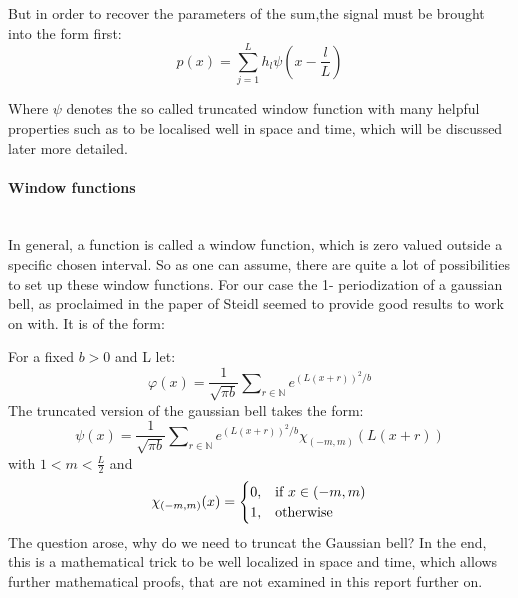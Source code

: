 \documentclass{article}
\begin{document}
But in order to recover the parameters of the sum,the signal must be brought into the form first:  
\begin{equation}\label{eqn:truncatedw}
 p(x)=\sum\limits_{j=1}^L h_{l}\psi(x-\frac{l}{L})
\end{equation}

Where $\psi$ denotes the so called truncated window function with many helpful properties such as to be localised well in space and time, which will be discussed later more detailed. \\

\paragraph{Window functions	} $ $\\[1ex]
In general, a function is called a window function, which is zero valued outside a specific chosen interval.
So as one can assume, there are quite a lot of possibilities to set up these window functions.
For our case the 1- periodization of a gaussian bell, as proclaimed in the paper of Steidl seemed to provide good results to work on with.
It is of the form: 

For a fixed $b>0$ and L let:
\begin{equation}
\varphi(x)= \frac{1}{\sqrt{\pi b}} \sum\nolimits_{r \in \mathbb{N}}  e^{(L(x+r))^2/b}
\end{equation}
The truncated version of the gaussian bell takes the form: 
\begin{equation}
\psi(x)= \frac{1}{\sqrt{\pi b}} \sum\nolimits_{r \in \mathbb{N}}  e^{(L(x+r))^2/b}\chi_{(-m,m)}(L(x+r))
\end{equation}
with $1<m < \frac{L}{2}$ and
\begin{equation}
    \chi_{(-m,m)}(x)=
    \begin{cases}
      0, & \text{if}\ x\in (-m,m) \\
      1, & \text{otherwise}
    \end{cases}\notag
\end{equation} 
The question arose, why do we need to truncat the Gaussian bell? In the end, this is a mathematical trick to be well localized in space and time, which allows further mathematical proofs, that are not examined in this report further on.
\end{document}
